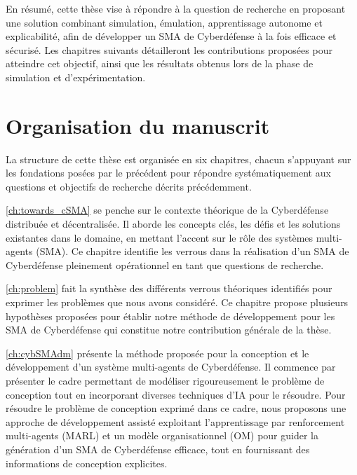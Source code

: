 En résumé, cette thèse vise à répondre à la question de recherche en proposant une solution combinant simulation, émulation, apprentissage autonome et explicabilité, afin de développer un SMA de Cyberdéfense à la fois efficace et sécurisé. Les chapitres suivants détailleront les contributions proposées pour atteindre cet objectif, ainsi que les résultats obtenus lors de la phase de simulation et d’expérimentation.


\section{Organisation du manuscrit}

La structure de cette thèse est organisée en six chapitres, chacun s'appuyant sur les fondations posées par le précédent pour répondre systématiquement aux questions et objectifs de recherche décrits précédemment.


\autoref{ch:towards_cSMA} se penche sur le contexte théorique de la Cyberdéfense distribuée et décentralisée. Il aborde les concepts clés, les défis et les solutions existantes dans le domaine, en mettant l'accent sur le rôle des systèmes multi-agents (SMA). Ce chapitre identifie les verrous dans la réalisation d'un SMA de Cyberdéfense pleinement opérationnel en tant que questions de recherche. 

\autoref{ch:problem} fait la synthèse des différents verrous théoriques identifiés pour exprimer les problèmes que nous avons considéré. Ce chapitre propose plusieurs hypothèses proposées pour établir notre méthode de développement pour les SMA de Cyberdéfense qui constitue notre contribution générale de la thèse.

\autoref{ch:cybSMAdm} présente la méthode proposée pour la conception et le développement d'un système multi-agents de Cyberdéfense. Il commence par présenter le cadre permettant de modéliser rigoureusement le problème de conception tout en incorporant diverses techniques d'IA pour le résoudre. Pour résoudre le problème de conception exprimé dans ce cadre, nous proposons une approche de développement assisté exploitant l'apprentissage par renforcement multi-agents (MARL) et un modèle organisationnel (OM) pour guider la génération d'un SMA de Cyberdéfense efficace, tout en fournissant des informations de conception explicites.

